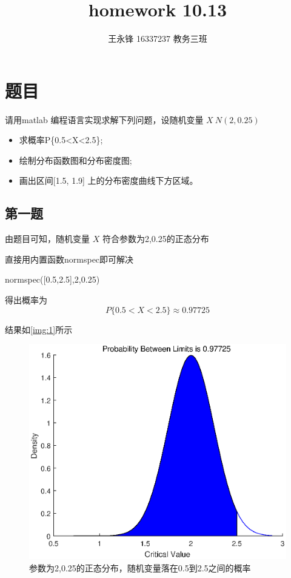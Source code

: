 \documentclass{article}
\begin{document}
\title{homework 10.13}
\author {王永锋 16337237 教务三班}
\maketitle

\section{题目}
请用matlab 编程语言实现求解下列问题，设随机变量 \( X~N(2, 0.25) \)

\begin{itemize}

\item 求概率P\{0.5<X<2.5\};
\item 绘制分布函数图和分布密度图;
\item 画出区间[1.5, 1.9] 上的分布密度曲线下方区域。

\end{itemize}

\subsection{第一题}
由题目可知，随机变量 \( X \) 符合参数为2,0.25的正态分布 \

直接用内置函数normspec即可解决

\begin{matlabcode}
    normspec([0.5,2.5],2,0.25)
\end{matlabcode}
得出概率为
\[ P\{0.5<X<2.5\} \approx 0.97725 \]

\clearpage

结果如\autoref{img:1}所示
\begin{figure}[!thbp]
\includegraphics[width=.5\textwidth]{1.eps}
\centering
\caption{参数为2,0.25的正态分布，随机变量落在0.5到2.5之间的概率} 
\label{img:1}
\end{figure}
\end{document}
